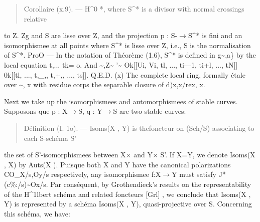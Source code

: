 \documentclass[11pt]{article}
\theoremstyle{plain}
\theoremstyle{definition}
\theoremstyle{remark}
\begin{document}
\begin{quote}Corollaire (x.9). --- H\textasciicircum{}0 *, where S\textasciicircum{}* is a divisor with normal crossings relative\end{quote}
to Z. Zg and S are lisse over Z, and the projection p : S-$\to$S\textasciicircum{}* is fini and an isomorphismee at all points where S\textasciicircum{}* is lisse over Z, i.e., S is the normalisation of S\textasciicircum{}*. ProO --- In the notation of Th\'eor\`eme (1.6), S\textasciicircum{}* is defined in g\textasciitilde{},a\} by the local equation t,... tk= o. And \textasciitilde{},Z\textasciitilde{} '\textasciitilde{} Ok[[Ui, Vi, tl, ..., ti---1, ti+l, ..., tN]] 0k[[tl, ..., t,\_,, t,+,, ..., ts]]. Q.E.D. (x) The complete local ring, formally \'etale over \textasciitilde{}, x with residue corps the separable closure of d)x,x/rex, x.

Next we take up the isomorphismees and automorphismees of stable curves. Supposons que p : X$\to$S, q : Y$\to$S are two stable curves:

\begin{quote}D\'efinition (I. 1o). --- Isoms(X , Y) is thefoncteur on (Sch/S) associating to each S-sch\'ema S'\end{quote}
the set of S'-isomorphismees between X$\times$ and Y$\times$ S'. If X=Y, we denote Isoms(X , X) by Auts(X ). Puisque both X and Y have the canonical polarizations CO\_X/s,Oy/s respectively, any isomorphismee f:X$\to$Y must satisfy J*(c\%:/s)\textasciitilde{}Ox/s. Par cons\'equent, by Grothendieck's results on the representability of the H\textasciicircum{}1lbert sch\'ema and related foncteurs [Grl] , we conclude that Isoms(X , Y) is represented by a sch\'ema Isoms(X , Y), quasi-projective over S. Concerning this sch\'ema, we have:
\end{document}
